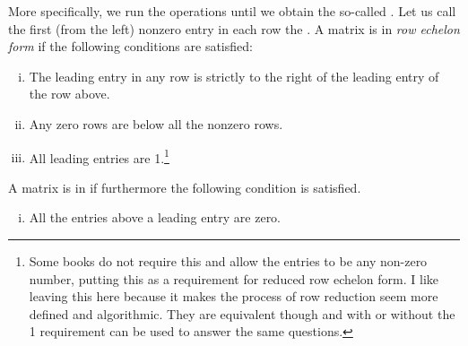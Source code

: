 More specifically, we run the operations until we obtain the so-called
\emph{}.
Let us call
the first (from the left) nonzero entry in each row the
\emph{}.  
A matrix is in \emph{row echelon form} if
the following conditions are satisfied:
\begin{enumerate}[(i)]
\item The leading entry in any row is strictly to the right of
the leading entry of the row above.
\item Any zero rows are below all the nonzero rows.
\item All leading entries are 1.\footnote{Some books do not require this and allow the entries to be any non-zero number, putting this as a requirement for reduced row echelon form. I like leaving this here because it makes the process of row reduction seem more defined and algorithmic. They are equivalent though and with or without the 1 requirement can be used to answer the same questions.}
\end{enumerate}
A matrix is in \emph{}
if furthermore the following condition is satisfied.
\begin{enumerate}[(i),resume]
\item All the entries above a leading entry are zero.
\end{enumerate}

